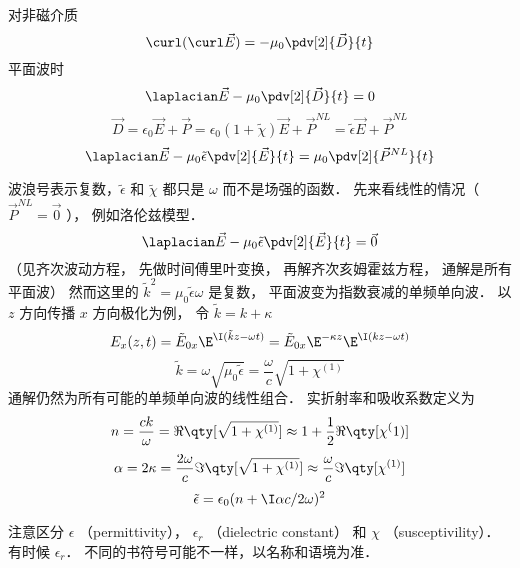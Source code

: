 
对非磁介质
\begin{equation}
\curl (\curl \vec E) = -\mu_0 \pdv[2]{\vec D}{t}
\end{equation}
平面波时
\begin{equation}
\laplacian \vec E - \mu_0 \pdv[2]{\vec D}{t} = 0
\end{equation}
\begin{equation}
\vec D = \epsilon_0 \vec E + \vec P = \epsilon_0(1 + \tilde\chi)\vec E + \vec P^{NL} = \tilde \epsilon \vec E + \vec P^{NL}
\end{equation}
\begin{equation}
\laplacian\vec E - \mu_0\tilde\epsilon \pdv[2]{\vec E}{t} = \mu_0 \pdv[2]{\vec P^{NL}}{t}
\end{equation}
 
波浪号表示复数，$\tilde\epsilon$ 和 $\tilde\chi$ 都只是 $\omega$ 而不是场强的函数． 先来看线性的情况（ $\vec P^{NL} = \vec 0$ ）， 例如洛伦兹模型．
\begin{equation}
\laplacian\vec E - \mu_0 \tilde\epsilon \pdv[2]{\vec E}{t} = \vec 0
\end{equation}
（见齐次波动方程， 先做时间傅里叶变换， 再解齐次亥姆霍兹方程， 通解是所有平面波） 然而这里的 $\tilde k^2 = \mu_0 \tilde \epsilon \omega$ 是复数， 平面波变为指数衰减的单频单向波． 以 $z$ 方向传播 $x$ 方向极化为例， 令  $\tilde k = k + \kappa$
\begin{equation}
E_x(z,t) = \tilde E_{0x} \E^{\I(\tilde kz - \omega t)} = \tilde E_{0x} \E^{-\kappa z} \E^{\I(kz - \omega t)}
\end{equation}
\begin{equation}
\tilde k = \omega \sqrt{\mu_0\tilde\epsilon} = \frac{\omega }{c}\sqrt {1 + \chi ^{(1)}}
\end{equation}
通解仍然为所有可能的单频单向波的线性组合． 实折射率和吸收系数定义为
\begin{equation}
n = \frac{ck}{\omega } = \Re\qty[\sqrt{1 + \chi ^{(1)}}] \approx 1 + \frac12 \Re\qty[\chi^(1)]
\end{equation}
\begin{equation}
\alpha  = 2\kappa  = \frac{2\omega}{c} \Im\qty[\sqrt{1+\chi^{(1)}}] \approx \frac{\omega}{c}\Im\qty[\chi ^{(1)}]
\end{equation}
\begin{equation}
\tilde \epsilon  = \epsilon_0 (n + \I \alpha c/2\omega )^2
\end{equation}
 
注意区分 $\epsilon$ （permittivity）， $\epsilon_r$ （dielectric constant） 和 $\chi$ （susceptivility）． 有时候 $\epsilon_r$． %
不同的书符号可能不一样，以名称和语境为准．

